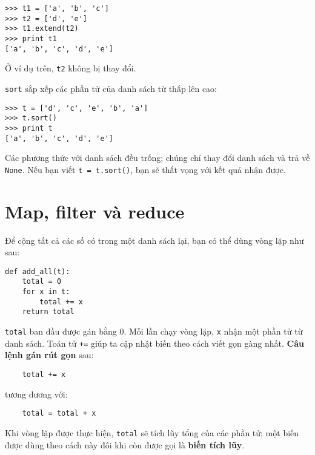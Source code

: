 \documentclass[11pt]{book}
\begin{document}

\beforeverb
\begin{verbatim}
>>> t1 = ['a', 'b', 'c']
>>> t2 = ['d', 'e']
>>> t1.extend(t2)
>>> print t1
['a', 'b', 'c', 'd', 'e']
\end{verbatim}
\afterverb
%
Ở ví dụ trên, {\tt t2} không bị thay đổi.

{\tt sort} sắp xếp các phần tử của danh sách từ thấp lên cao:


\beforeverb
\begin{verbatim}
>>> t = ['d', 'c', 'e', 'b', 'a']
>>> t.sort()
>>> print t
['a', 'b', 'c', 'd', 'e']
\end{verbatim}
\afterverb
%
Các phương thức với danh sách đều trống; chúng chỉ thay đổi danh sách và
trả về {\tt None}. Nếu bạn viết {\tt t = t.sort()}, bạn sẽ thất vọng với
kết quả nhận được.



\section{Map, filter và reduce}

Để cộng tất cả các số có trong một danh sách lại, bạn có thể dùng vòng lặp như sau:


\beforeverb
\begin{verbatim}
def add_all(t):
    total = 0
    for x in t:
        total += x
    return total
\end{verbatim}
\afterverb
%
{\tt total} ban đầu được gán bằng 0. Mỗi lần chạy vòng lặp,
{\tt x} nhận một phần tử từ danh sách. Toán tử {\tt +=} giúp ta
cập nhật biến theo cách viết gọn gàng nhất. 
{\bf Câu lệnh gán rút gọn} sau:



\beforeverb
\begin{verbatim}
    total += x
\end{verbatim}
\afterverb
%
tương đương với:

\beforeverb
\begin{verbatim}
    total = total + x
\end{verbatim}
\afterverb
%
Khi vòng lặp được thực hiện, {\tt total} sẽ tích lũy tổng của
các phần tử; một biến được dùng theo cách này đôi khi còn được
gọi là {\bf biến tích lũy}.
\end{document}
